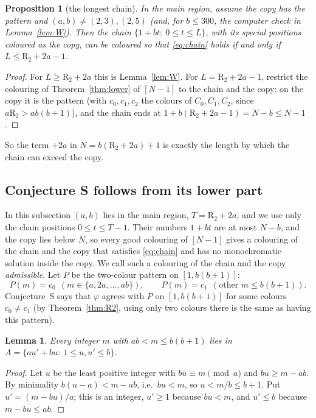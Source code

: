 \documentclass[11pt,a4paper]{article}
\newtheorem{lemma}[theorem]{Lemma}
\newtheorem{proposition}[theorem]{Proposition}
\theoremstyle{definition}
\theoremstyle{remark}
\newcommand{\R}{\mathrm{R}}
\begin{document}
\begin{proposition}[the longest chain]\label{prop:chain}
In the main region, assume the copy has the pattern and $(a,b)\ne(2,3),(2,5)$ (and, for $b\le300$, the computer check in Lemma~\ref{lem:W}). Then the chain $\{1+bt:\ 0\le t\le L\}$, with its special positions coloured as the copy, can be coloured so that \eqref{eq:chain} holds if and only if $L\le\R_2+2a-1$.
\end{proposition}
\begin{proof}
For $L\ge\R_2+2a$ this is Lemma~\ref{lem:W}. For $L=\R_2+2a-1$, restrict the colouring of Theorem~\ref{thm:lower} of $[N-1]$ to the chain and the copy: on the copy it is the pattern (with $c_0,c_1,c_2$ the colours of $C_0,C_1,C_2$, since $a\R_2>ab(b+1)$), and the chain ends at $1+b(\R_2+2a-1)=N-b\le N-1$.
\end{proof}
So the term $+2a$ in $N=b(\R_2+2a)+1$ is exactly the length by which the chain can exceed the copy.

\subsection{Conjecture S follows from its lower part}\label{sec:lowerpart}
In this subsection $(a,b)$ lies in the main region, $T=\R_2+2a$, and we use only the chain positions $0\le t\le T-1$. Their numbers $1+bt$ are at most $N-b$, and the copy lies below $N$, so every good colouring of $[N-1]$ gives a colouring of the chain and the copy that satisfies \eqref{eq:chain} and has no monochromatic solution inside the copy. We call such a colouring of the chain and the copy \emph{admissible}. Let $P$ be the two-colour pattern on $[1,b(b+1)]$:
\[
  P(m)=c_0\ \ (m\in\{a,2a,\dots,ab\}),\qquad P(m)=c_1\ \ (\text{other }m\le b(b+1)).
\]
Conjecture~S says that $\varphi$ agrees with $P$ on $[1,b(b+1)]$ for some colours $c_0\ne c_1$ (by Theorem~\ref{thm:R2}, using only two colours there is the same as having this pattern).

\begin{lemma}\label{lem:A}
Every integer $m$ with $ab<m\le b(b+1)$ lies in $A=\{au'+bu:\ 1\le u,u'\le b\}$.
\end{lemma}
\begin{proof}
Let $u$ be the least positive integer with $bu\equiv m\pmod a$ and $bu\ge m-ab$. By minimality $b(u-a)<m-ab$, i.e.\ $bu<m$, so $u<m/b\le b+1$. Put $u'=(m-bu)/a$; this is an integer, $u'\ge1$ because $bu<m$, and $u'\le b$ because $m-bu\le ab$.
\end{proof}
\end{document}
